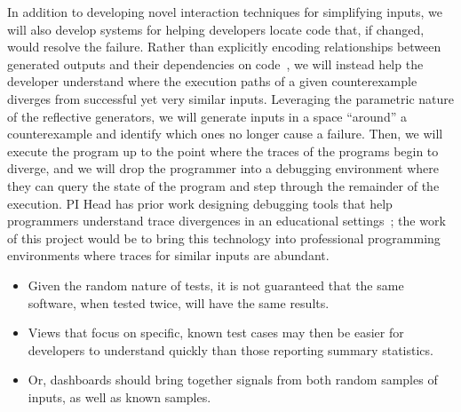 In addition to developing novel interaction techniques for simplifying inputs,
we will also develop systems for helping developers locate code that, if
changed, would resolve the failure. Rather than explicitly encoding
relationships between generated outputs and their dependencies on
code~\cite{ref:ko2009finding}, we will instead help the developer
understand where the execution paths of a given counterexample diverges from
successful yet very similar inputs. Leveraging the parametric nature of the
reflective generators, we will generate inputs in a space ``around'' a
counterexample and identify which ones no longer cause a failure.  Then, we will
execute the program up to the point where the traces of the programs begin to
diverge, and we will drop the programmer into a debugging environment where
they can query the state of the program and step through the remainder of the
execution. PI Head has prior work designing debugging tools that help
programmers understand trace divergences in an educational
settings~\cite{ref:suzuki2017tracediff}; the work of this project would be to
bring this technology into professional programming environments where traces
for similar inputs are abundant.

%

\begin{itemize}
  \item Given the random nature of tests, it is not guaranteed that the same
    software, when tested twice, will have the same results.
  \item Views that focus on specific, known test cases may then be easier for
    developers to understand quickly than those reporting summary statistics.
  \item Or, dashboards should bring together signals from both random samples
    of inputs, as well as known samples.
\end{itemize}


